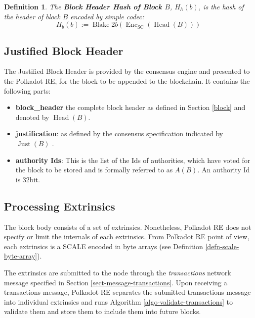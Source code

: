 \documentclass{article}
\newcommand{\assign}{:=}
\newcommand{\tmem}[1]{{\em #1\/}}
\newcommand{\tmop}[1]{\ensuremath{\operatorname{#1}}}
\newcommand{\tmsamp}[1]{\textsf{#1}}
\newcommand{\tmstrong}[1]{\textbf{#1}}
\newcommand{\tmtextbf}[1]{{\bfseries{#1}}}
\newcommand{\tmtextit}[1]{{\itshape{#1}}}
\newcommand{\tmtextsf}[1]{{\sffamily{#1}}}
\newtheorem{definition}{Definition}
\providecommand{\tmem}[1]{\tmtextit{#1}}
\providecommand{\tmop}[1]{\ensuremath{\mathrm{#1}}}
\providecommand{\tmsamp}[1]{\tmtextsf{#1}}
\providecommand{\tmstrong}[1]{\tmtextbf{#1}}
\providecommand{\tmtextbf}[1]{\tmtextbf{#1}}
\providecommand{\tmtextit}[1]{\tmtextit{#1}}
\newtheorem{definition}{Definition}
\begin{document}
\begin{definition}
  \label{def-block-header-hash}The {\tmstrong{Block Header Hash of Block
  $B$}}, {\tmstrong{$H_h (b)$}}, is the hash of the header of block $B$
  encoded by simple codec:
  \[ H_b (b) \assign \tmop{Blake} 2 b (\tmop{Enc}_{\tmop{SC}} (\tmop{Head}
     (B))) \]
\end{definition}

\subsection{Justified Block Header}

The Justified Block Header is provided by the consensus engine and presented
to the Polkadot RE, for the block to be appended to the blockchain. It
contains the following parts:
\begin{itemize}
  \item {\tmstrong{{\tmsamp{{\tmstrong{block\_header}}}}}} the complete block
  header as defined in Section \ref{block} and denoted by $\tmop{Head} (B)$.
  
  \item {\tmstrong{{\tmsamp{justification}}}}: as defined by the consensus
  specification indicated by $\tmop{Just} (B)$ {}.
  
  \item {\tmstrong{{\tmsamp{authority Ids}}}}: This is the list of the Ids of
  authorities, which have voted for the block to be stored and is formally
  referred to as $A (B)$. An authority Id is 32bit.
\end{itemize}

\subsection{Processing Extrinsics}

The block body consists of a set of extrinsics. Nonetheless, Polkadot RE does
not specify or limit the internals of each extrinsics. From Polkadot RE point
of view, each extrinsics is a SCALE encoded in byte arrays (see Definition
\ref{defn-scale-byte-array}).

The extrinsics are submitted to the node through the {\tmem{transactions}}
network message specified in Section \ref{sect-message-transactions}. Upon
receiving a transactions message, Polkadot RE separates the submitted
transactions message into individual extrinsics and runs Algorithm
\ref{algo-validate-transactions} to validate them and store them to include
them into future blocks.
\end{document}
